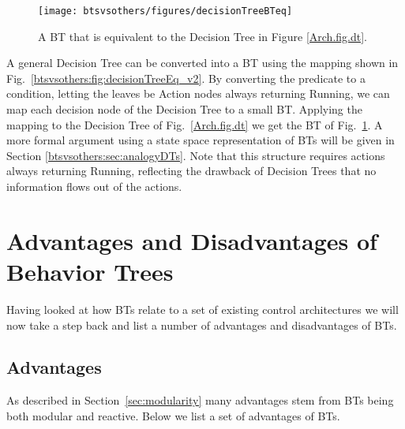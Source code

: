 \begin{figure}[htbp]
\begin{center}
\texttt{[image: btsvsothers/figures/decisionTreeBTeq]}
\caption{A BT that is equivalent to the Decision Tree in Figure  \ref{Arch.fig.dt}. 
}
\label{btsvsothers:fig:decisionTreeBTeq_v2}
\end{center}
\end{figure}

A general Decision Tree can be converted into a BT using the mapping shown in Fig.~\ref{btsvsothers:fig:decisionTreeEq_v2}. By converting the predicate to a condition, letting the leaves be Action nodes always returning Running, we can map each decision node of the Decision Tree to a small BT. Applying the mapping to the Decision Tree of Fig.~\ref{Arch.fig.dt} we get the BT of Fig.~\ref{btsvsothers:fig:decisionTreeBTeq_v2}.
A more formal argument using a state space representation of BTs will be given in Section \ref{btsvsothers:sec:analogyDTs}.
Note that this structure requires actions always returning Running, reflecting the drawback of Decision Trees that no information flows out of the actions.


\section{Advantages and Disadvantages of Behavior Trees}
\label{btasca.sec.properties} 
Having looked at how BTs relate to a set of existing control architectures we will now take a step back and list a number of advantages and disadvantages 
of BTs. 


\subsection{Advantages}

As described in Section~\ref{sec:modularity} many advantages stem from BTs being both modular and reactive.
Below we list a set of advantages of BTs.



